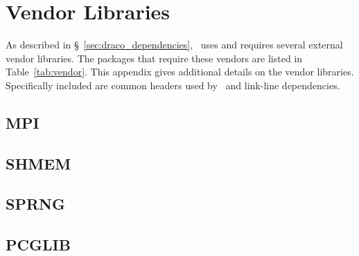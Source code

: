 
\chapter{Vendor Libraries}
\label{app:vendor_libs}

As described in \S~\ref{sec:draco_dependencies}, \draco\ uses and
requires several external vendor libraries.  The packages that require
these vendors are listed in Table~\ref{tab:vendor}.  This appendix
gives additional details on the vendor libraries.  Specifically
included are common headers used by \draco\ and link-line
dependencies.


\section{MPI}
\label{appsec:mpi}


\section{SHMEM}
\label{appsec:shmem}


\section{SPRNG}
\label{appsec:sprng}


\section{PCGLIB}
\label{appsec:pcglib}